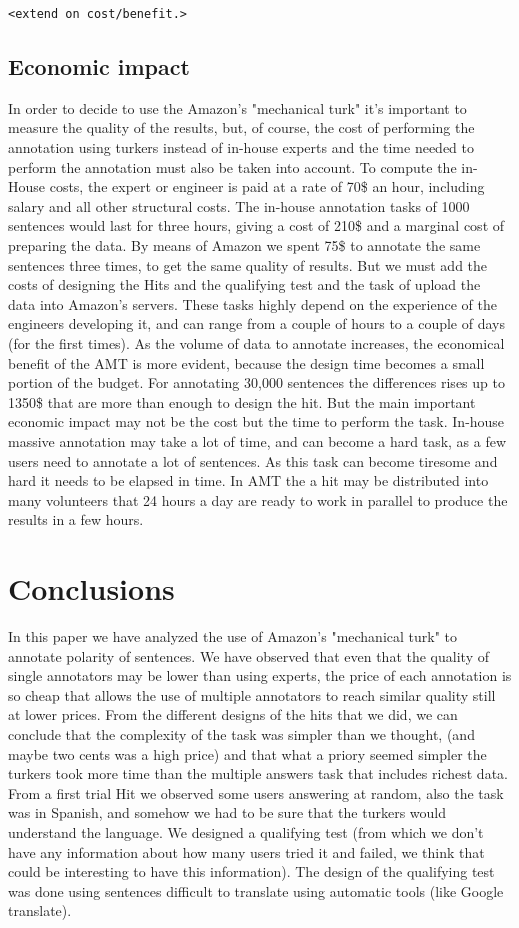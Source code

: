 \documentclass[11pt,letterpaper]{article}
\begin{document}
\begin{table}
\texttt{<extend on cost/benefit.>}

\subsection{Economic impact}
In order to decide to use the Amazon's "mechanical turk" it's important to measure the quality of the results, but, of course, the cost of performing the annotation using turkers instead of in-house experts and the time needed to perform the annotation must also be taken into account.
To compute the in-House costs, the expert or engineer is paid at a rate of 70\$ an hour, including salary and all other structural costs. The in-house annotation tasks of 1000 sentences would last for three hours, giving a cost of 210\$ and a marginal cost of preparing the data. By means of Amazon we spent 75\$ to annotate the same sentences three times, to get the same quality of results. But we must add the costs of designing the Hits and  the qualifying test and the task of upload the data into Amazon's servers. These tasks highly depend on the experience of the engineers developing it, and can range from a couple of hours to a couple of days (for the first times).
As the volume of data to annotate increases, the economical benefit of the AMT is more evident, because the design time becomes a small portion of the budget. For annotating 30,000 sentences the differences rises up to 1350\$ that are more than enough to design the hit. 
But the main important economic impact may not be the cost but the time to perform the task. In-house massive annotation may take a lot of time, and can become a hard task, as a few users need to annotate a lot of sentences. As this task can become tiresome and hard it needs to be elapsed in time. In AMT the a hit may be distributed into many volunteers that 24 hours a day are ready to work in parallel to produce the results in a few hours.     
\section{Conclusions}
In this paper we have analyzed the use of Amazon's "mechanical turk" to annotate polarity of sentences. We have observed that even that the quality of single annotators may be lower than using experts, the price of each annotation is so cheap that allows the use of multiple annotators to reach similar quality still at lower prices. 
From the different designs of the hits that we did, we can conclude that the complexity of the task was simpler than we thought, (and maybe two cents was a high price) and that what a priory seemed simpler the turkers took more time than the multiple answers task that includes richest data. From a first trial Hit we observed some users answering at random, also the task was in Spanish, and somehow we had to be sure that the turkers would understand the language. We designed a qualifying test (from which we don't have any information about how many users tried it and failed, we think that could be interesting to have this information). The design of the qualifying test was done using sentences difficult to translate using automatic tools (like Google translate).


\end{table}
\end{document}
